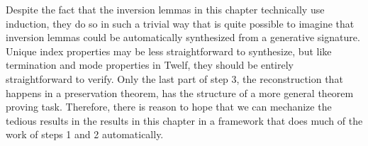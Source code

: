 \noindent
Despite the fact that the inversion lemmas in this chapter technically
use induction, they do so in such a trivial way that is quite possible
to imagine that inversion lemmas could be automatically synthesized
from a generative signature. Unique index properties may be less
straightforward to synthesize, but like termination and mode
properties in Twelf, they should be entirely straightforward to
verify. Only the last part of step 3, the reconstruction that happens
in a preservation theorem, has the structure of a more general theorem
proving task. Therefore, there is reason to hope that we can mechanize the
tedious results in the results in this chapter in a framework that
does much of the work of steps 1 and 2 automatically.











